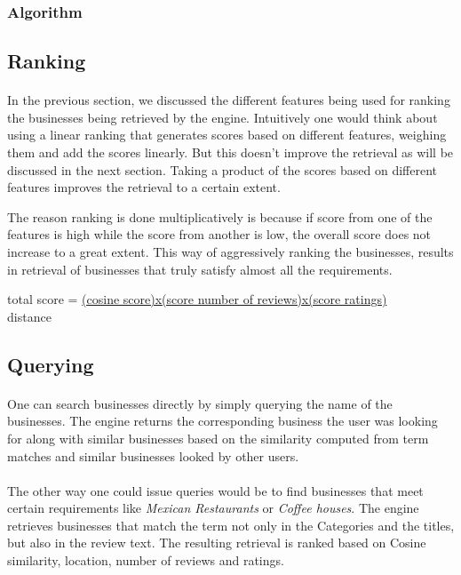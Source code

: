\documentclass{article} %
\begin{document}
\subsubsection{Algorithm}
\subsection{Ranking}
\paragraph{}In the previous section, we discussed the different features being used for ranking the businesses being retrieved by the engine. Intuitively one would think about using a linear ranking that generates scores based on different features, weighing them and add the scores linearly. But this doesn't improve the retrieval as will be discussed in the next section. Taking a product of the scores based on different features improves the retrieval to a certain extent. 

The reason ranking is done multiplicatively is because if score from one of the features is high while the score from another is low, the overall score does not increase to a great extent. This way of aggressively ranking the businesses, results in retrieval of businesses that truly satisfy almost all the requirements. 
\begin{center}
total score = \underline{(cosine score)x(score number of reviews)x(score ratings)}
                             \\  distance

\end{center}
\subsection{Querying}
\paragraph{}One can search businesses directly by simply querying the name of the businesses. The engine returns the corresponding business the user was looking for along with similar businesses based on the similarity computed from term matches and similar businesses looked by other users. 
\paragraph{}The other way one could issue queries would be to find businesses that meet certain requirements like \textit{Mexican Restaurants} or \textit{Coffee houses}. The engine retrieves businesses that match the term not only in the Categories and the titles, but also in the review text. The resulting retrieval is ranked based on Cosine similarity, location, number of reviews and ratings.
\end{document}
